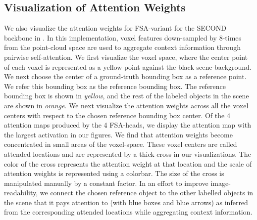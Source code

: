 \documentclass[10pt,twocolumn,letterpaper]{article}
\begin{document}
\subsection{Visualization of Attention Weights}
We also visualize the attention weights for FSA-variant for the SECOND \cite{SECOND} backbone in . In this implementation, voxel features down-sampled by 8-times from the point-cloud space are used to aggregate context information through pairwise self-attention. We first visualize the voxel space, where the center point of each voxel is represented as a yellow point against the black scene-background. We next choose the center of a ground-truth bounding box as a reference point. We refer this bounding box as the reference bounding box. The reference bounding box is shown in \textit{yellow}, and the rest of the labeled objects in the scene are shown in \textit{orange}. We next visualize the attention weights across all the voxel centers with respect to the chosen reference bounding box center. Of the 4 attention maps produced by the 4 FSA-heads, we display the attention map with the largest activation in our figures. We find that attention weights become concentrated in small areas of the voxel-space. These voxel centers are called attended locations and are represented by a thick cross in our visualizations. The color of the cross represents the attention weight at that location and the scale of attention weights is represented using a colorbar. The size of the cross is manipulated manually by a constant factor. In an effort to improve image-readability, we connect the chosen reference object to the other labelled objects in the scene that it pays attention to (with blue boxes and blue arrows) as inferred from the corresponding attended locations while aggregating context information. 
\setlength{\tabcolsep}{16.7pt}
\end{document}
